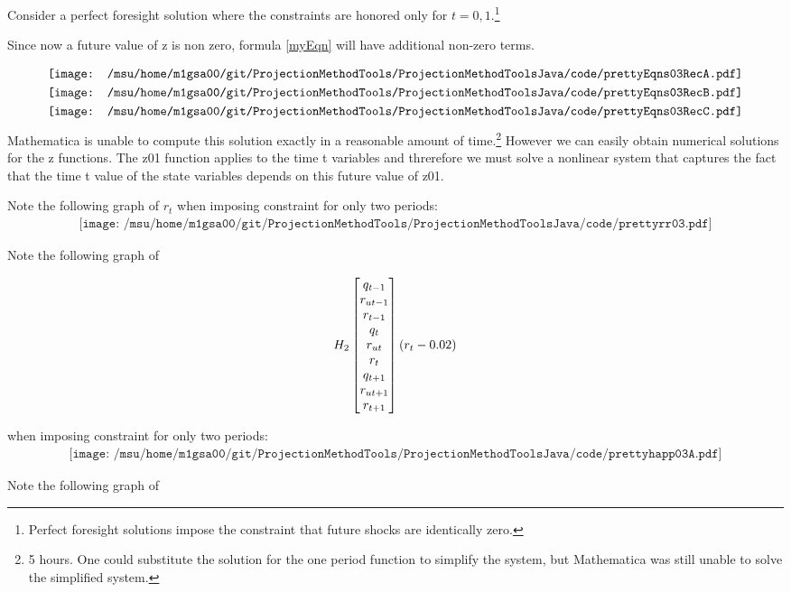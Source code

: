 
Consider a perfect foresight solution where the constraints are honored only 
for $t=0,1$.\footnote{ Perfect foresight solutions impose the constraint that future shocks are identically zero.}

Since now a future value of z is non zero, formula \ref{myEqn}  will have additional non-zero terms.


\begin{gather*}
  \vcenter{\hbox{\texttt{[image: /msu/home/m1gsa00/git/ProjectionMethodTools/ProjectionMethodToolsJava/code/prettyEqns03RecA.pdf]}}}\\
  \vcenter{\hbox{\texttt{[image: /msu/home/m1gsa00/git/ProjectionMethodTools/ProjectionMethodToolsJava/code/prettyEqns03RecB.pdf]}}}\\
  \vcenter{\hbox{\texttt{[image: /msu/home/m1gsa00/git/ProjectionMethodTools/ProjectionMethodToolsJava/code/prettyEqns03RecC.pdf]}}}\\
\end{gather*}
Mathematica is unable to compute this solution exactly in a reasonable amount
of time.\footnote{ 5 hours.  One could substitute the solution for the one period function to simplify the system, but Mathematica was still unable to solve the simplified system.}  However we can easily obtain numerical solutions for the z functions.  The z01 function applies to the time t variables and 
threrefore we must solve a nonlinear system that captures the fact that
the time t value of the state variables depends on this future value of z01.


Note the following graph of $r_t$ when imposing constraint for only two periods:
\begin{gather*}
\texttt{[image: /msu/home/m1gsa00/git/ProjectionMethodTools/ProjectionMethodToolsJava/code/prettyrr03.pdf]}
\end{gather*}





 Note the following graph of 

 \begin{gather*}
 H_{2}\begin{bmatrix} q_{t-1}\\r_{ut-1}\\r_{t-1}\\ q_{t}\\r_{ut}\\r_{t}\\ q_{t+1}\\r_{ut+1}\\r_{t+1} \end{bmatrix} ( r_t-0.02)
 \end{gather*}

  when imposing constraint for only two periods:
 \begin{gather*}
 \texttt{[image: /msu/home/m1gsa00/git/ProjectionMethodTools/ProjectionMethodToolsJava/code/prettyhapp03A.pdf]}
 \end{gather*}


 Note the following graph of 

